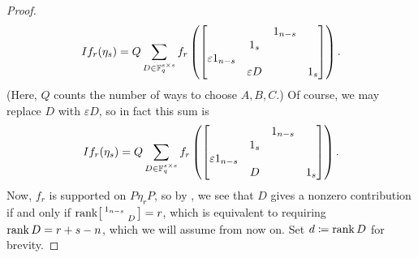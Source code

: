 \begin{proof}
	\[If_r(\eta_s)=Q\sum_{D\in\mathbb F_q^{s\times s}}f_r\left(\begin{bmatrix}
		&& 1_{n-s} \\ & 1_s \\
		\varepsilon1_{n-s} &   &   \\ & \varepsilon D &   & 1_s
	\end{bmatrix}\right).\]
	(Here, $Q$ counts the number of ways to choose $A,B,C$.) Of course, we may replace $D$ with $\varepsilon D$, so in fact this sum is
	\[If_r(\eta_s)=Q\sum_{D\in\mathbb F_q^{s\times s}}f_r\left(\begin{bmatrix}
		&& 1_{n-s} \\ & 1_s \\
		\varepsilon1_{n-s} &   &   \\ & D &   & 1_s
	\end{bmatrix}\right).\]
	Now, $f_r$ is supported on $P\eta_rP$, so by , we see that $D$ gives a nonzero contribution if and only if $\operatorname{rank}\begin{bsmallmatrix}
		1_{n-s} \\ & D
	\end{bsmallmatrix}=r$, which is equivalent to requiring $\operatorname{rank}D=r+s-n$, which we will assume from now on. Set $d\coloneqq\operatorname{rank}D$ for brevity.
	

\end{proof}
